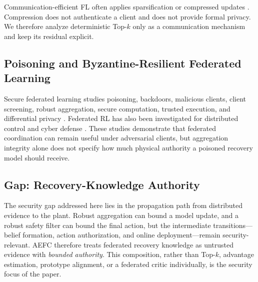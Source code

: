 Communication-efficient FL often applies sparsification or compressed updates \cite{jia2025comprehensive,11090013}. Compression does not authenticate a client and does not provide formal privacy. We therefore analyze deterministic Top-$k$ only as a communication mechanism and keep its residual explicit.

\subsection{Poisoning and Byzantine-Resilient Federated Learning}
Secure federated learning studies poisoning, backdoors, malicious clients, client screening, robust aggregation, secure computation, trusted execution, and differential privacy \cite{miao2024esfl,miao2024asyfl,mu2024feddmc,zhao2026sxgb,kato2023olive,liu2026dpfedadamw,zhao2026fedmop,patel2026pfdm}. Federated RL has also been investigated for distributed control and cyber defense \cite{qi2021federated,10908884,10483278,10536634,qi2025federated}. These studies demonstrate that federated coordination can remain useful under adversarial clients, but aggregation integrity alone does not specify how much physical authority a poisoned recovery model should receive.

\subsection{Gap: Recovery-Knowledge Authority}
The security gap addressed here lies in the propagation path from distributed evidence to the plant. Robust aggregation can bound a model update, and a robust safety filter can bound the final action, but the intermediate transitions---belief formation, action authorization, and online deployment---remain security-relevant. AEFC therefore treats federated recovery knowledge as untrusted evidence with \emph{bounded authority}. This composition, rather than Top-$k$, advantage estimation, prototype alignment, or a federated critic individually, is the security focus of the paper.
